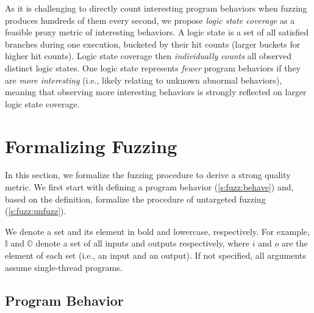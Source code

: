 \documentclass[letterpaper,twocolumn,10pt]{article}
\begin{document}
As it is challenging to directly count interesting program behaviors when
fuzzing produces hundreds of them every second, we propose \emph{logic state
coverage} as a feasible proxy metric of interesting behaviors. A logic state is
a set of all satisfied branches during one execution, bucketed by their hit
counts (larger buckets for higher hit counts). Logic state coverage then
\emph{individually counts} all observed distinct logic states.  One logic state
represents \emph{fewer} program behaviors if they are \emph{more interesting}
(i.e., likely relating to unknown abnormal behaviors), meaning that observing
more interesting behaviors is strongly reflected on larger logic state coverage. 



\section{Formalizing Fuzzing}

In this section, we formalize the fuzzing procedure to derive a strong quality
metric. We first start with defining a program
behavior (\autoref{s:fuzz:behave}) and, based on the definition, formalize the
procedure of untargeted fuzzing (\autoref{s:fuzz:unfuzz}).

%
We denote a set and its element in bold and lowercase, respectively.  For
example, $\mathbb{I}$ and $\mathbb{O}$ denote a set of all inputs and outputs
respectively, where $i$ and $o$ are the element of each set (i.e., an input and
an output). If not specified, all arguments assume single-thread programs.

\subsection{Program Behavior}
\label{s:fuzz:behave}

\end{document}
